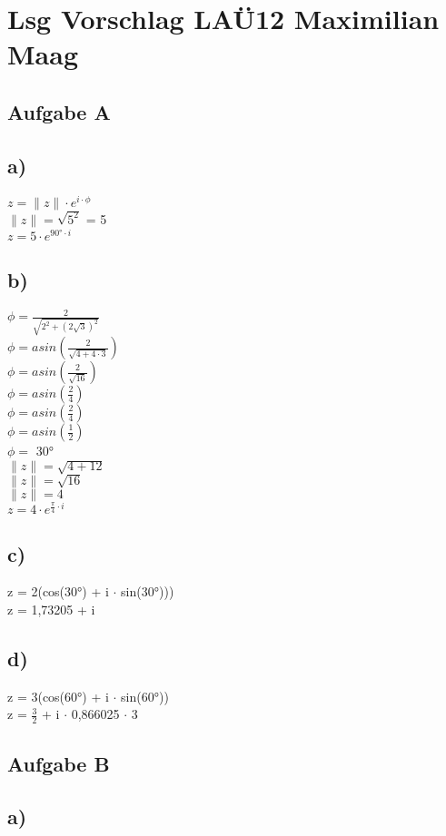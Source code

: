 \documentclass{article}
\begin{document}
	\section*{Lsg Vorschlag LAÜ12 Maximilian Maag}
	\subsection*{Aufgabe A}
	\subsection*{a)}
	$ z = \|z\| \cdot e^{i \cdot \phi}$ \\
	$\|z\| = \sqrt{5^2}$ = 5 \\
	$z = 5 \cdot e^{90° \cdot i}$
	\subsection*{b)}
	$\phi = \frac{2}{\sqrt{2^2 + (2\sqrt{3})^{2}}}$ \\
	$\phi = asin(\frac{2}{\sqrt{4+ 4 \cdot 3}})$ \\
	$\phi = asin(\frac{2}{\sqrt{16}})$ \\
	$\phi = asin(\frac{2}{4})$ \\
	$\phi = asin(\frac{2}{4})$ \\
	$\phi = asin(\frac{1}{2})$ \\
	$\phi =$ 30° \\
	$\|z\| = \sqrt{4 + 12}$ \\
	$\|z\| = \sqrt{16}$ \\
	$\|z\| = 4$ \\
	$z = 4 \cdot e^{\frac{\pi}{4} \cdot i}$
	\subsection*{c)}
	z = 2(cos(30°) + i $\cdot$ sin(30°)))\\
	z = 1,73205 + i
	\subsection*{d)}
	z = 3(cos(60°) + i $\cdot$ sin(60°)) \\
	z = $\frac{3}{2}$ + i $\cdot$ 0,866025 $\cdot$ 3
	\subsection*{Aufgabe B}
	\subsection*{a)}
\end{document}

